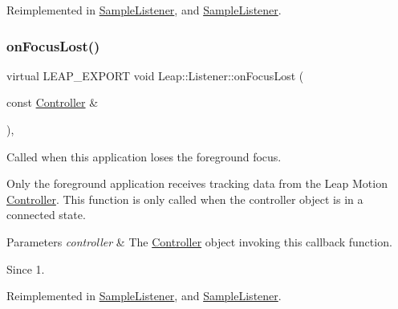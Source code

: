 Reimplemented in \hyperlink{class_sample_listener_a17d7075b90f556b34682eefd1f966219}{Sample\+Listener}, and \hyperlink{class_sample_listener_afd74ae8efc625ef62985d9d0fa33290c}{Sample\+Listener}.

\mbox{\label{class_leap_1_1_listener_a7bcae44a40674c3f1e367b911201d252}} 
\subsubsection{\texorpdfstring{on\+Focus\+Lost()}{onFocusLost()}}
{\footnotesize\ttfamily virtual L\+E\+A\+P\+\_\+\+E\+X\+P\+O\+RT void Leap\+::\+Listener\+::on\+Focus\+Lost (\begin{DoxyParamCaption}\item[{const \hyperlink{class_leap_1_1_controller}{Controller} \&}]{ }\end{DoxyParamCaption})\hspace{0.3cm}{\ttfamily [inline]}, {\ttfamily [virtual]}}

Called when this application loses the foreground focus.

Only the foreground application receives tracking data from the Leap Motion \hyperlink{class_leap_1_1_controller}{Controller}. This function is only called when the controller object is in a connected state.


\begin{DoxyCodeInclude}
\end{DoxyCodeInclude}



\begin{DoxyParams}{Parameters}
{\em controller} & The \hyperlink{class_leap_1_1_controller}{Controller} object invoking this callback function. \\
\hline
\end{DoxyParams}
\begin{DoxySince}{Since}
1. 
\end{DoxySince}


Reimplemented in \hyperlink{class_sample_listener_a3b245f2961cec0c592ebdfaf797d6365}{Sample\+Listener}, and \hyperlink{class_sample_listener_a9510c508c13ed2ce6afe224dca483e0b}{Sample\+Listener}.

\mbox{\label{class_leap_1_1_listener_ab600421108bbc952d8f0f144384ca30f}} 
